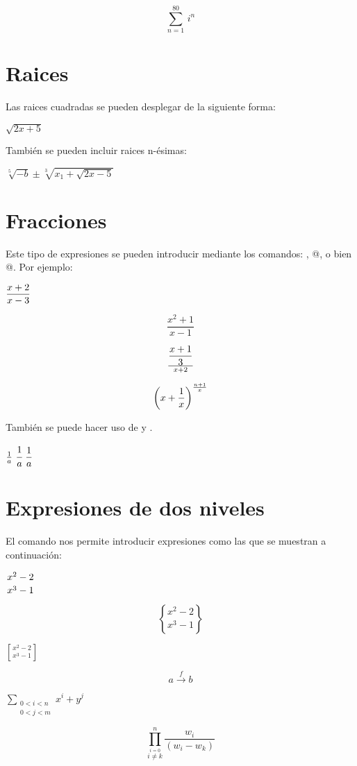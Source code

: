 \documentclass[letterpaper,12pt]{article}
\begin{document}
$$ \sum_{n=1}^{80} \, i^n $$

\section{Raices}

Las raices cuadradas se pueden desplegar de la siguiente forma:

$\displaystyle \sqrt{2 x + 5}$

También se pueden incluir raices n-ésimas:

$\displaystyle \sqrt[5]{-b} \pm \sqrt[3]{x_1 + \sqrt{2 x -5}}$

\section{Fracciones}

Este tipo de expresiones se pueden introducir mediante los comandos: \verb@\over@, \verb@\frac{}{}@, o bien \verb@{ \atop }@. Por ejemplo:

$\displaystyle {x+2 \over x-3}$

\[ \frac{x^2 + 1}{x-1}\]

\[ {{x + 1}\over{3}} \over {x+2} \]

$$\displaystyle{\left( x + {1 \over x} \right)^{n+1 \over x}}$$

También se puede hacer uso de \verb@\cfrac@ y \verb@\dfrac@.

$\frac{1}{a} \,\, \cfrac{1}{a} \,\, \dfrac{1}{a}$

\section{Expresiones de dos niveles}

El comando \verb@\atop@ nos permite introducir expresiones como las que se muestran a continuación:

$\displaystyle {x^2-2 \atop x^3-1}$

$$\displaystyle {x^2-2 \brace x^3-1}$$

$\displaystyle {x^2-2 \brack x^3-1}$

$$\displaystyle{a \stackrel{f}{\rightarrow} b}$$

$\displaystyle{\sum_{\substack{0<i<n\\0<j<m}} x^i + y^j}$

\[ \prod_{\overset{i=0}{i\neq k}}^{n}\frac{w_i}{(w_i-w_k)} \]
\end{document}
